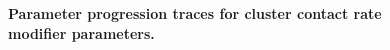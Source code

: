 \begin{figure}[ht]
    \caption{\textbf{Parameter progression traces for cluster contact rate modifier parameters.}}
\end{figure}

